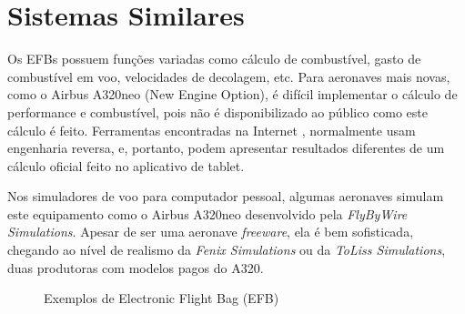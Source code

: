 \chapter{Sistemas Similares}
Os EFBs possuem funções variadas como cálculo de combustível, gasto de combustível
em voo, velocidades de decolagem, etc. \cite{wired-efb} Para aeronaves mais novas, como o Airbus 
A320neo (New Engine Option), é difícil implementar o cálculo de performance e combustível, pois não 
é disponibilizado ao público como este cálculo é feito. Ferramentas encontradas 
na Internet \cite{a320-perf}, normalmente usam engenharia reversa, e, portanto, 
podem apresentar resultados diferentes de um cálculo oficial feito no aplicativo
de tablet.

Nos simuladores de voo para computador pessoal, algumas aeronaves simulam
este equipamento como o Airbus A320neo desenvolvido pela \textit{FlyByWire Simulations}. 
Apesar de ser uma aeronave \textit{freeware}, ela é bem sofisticada, chegando ao 
nível de realismo da \textit{Fenix Simulations} ou da \textit{ToLiss Simulations}, 
duas produtoras com modelos pagos do A320.

\begin{figure}%
    \centering
    \qquad

    \caption{Exemplos de Electronic Flight Bag (EFB)}
    
    \label{fig:example}%
\end{figure}

